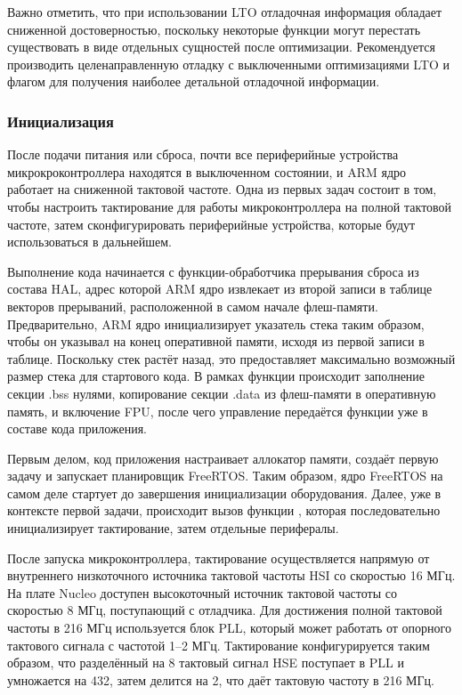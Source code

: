 \documentclass[rusmathsym, eqnumwithinsec, amspack, hyperref]{bomgost}
\begin{document}
Важно отметить, что при использовании LTO отладочная информация обладает сниженной достоверностью, поскольку некоторые функции могут перестать существовать в виде отдельных сущностей после оптимизации. Рекомендуется производить целенаправленную отладку с выключенными оптимизациями LTO и флагом {\footnotesize{}} для получения наиболее детальной отладочной информации.


\subsubsection{Инициализация}

После подачи питания или сброса, почти все периферийные устройства микрокроконтроллера находятся в выключенном состоянии, и ARM ядро работает на сниженной тактовой частоте. Одна из первых задач состоит в том, чтобы настроить тактирование для работы микроконтроллера на полной тактовой частоте, затем сконфигурировать периферийные устройства, которые будут использоваться в дальнейшем.

Выполнение кода начинается с функции-обработчика прерывания сброса из состава HAL, адрес которой ARM ядро извлекает из второй записи в таблице векторов прерываний, расположенной в самом начале флеш-памяти. Предварительно, ARM ядро инициализирует указатель стека таким образом, чтобы он указывал на конец оперативной памяти, исходя из первой записи в таблице. Поскольку стек растёт назад, это предоставляет максимально возможный размер стека для стартового кода. В рамках функции {\footnotesize{}} происходит заполнение секции .bss нулями, копирование секции .data из флеш-памяти в оперативную память, и включение FPU, после чего управление передаётся функции {\footnotesize{}} уже в составе кода приложения.

Первым делом, код приложения настраивает аллокатор памяти, создаёт первую задачу и запускает планировщик FreeRTOS. Таким образом, ядро FreeRTOS на самом деле стартует до завершения инициализации оборудования. Далее, уже в контексте первой задачи, происходит вызов функции {\footnotesize{}}, которая последовательно инициализирует тактирование, затем отдельные перифералы.

После запуска микроконтроллера, тактирование осуществляется напрямую от внутреннего низкоточного источника тактовой частоты HSI со скоростью 16 МГц. На плате Nucleo доступен высокоточный источник тактовой частоты со скоростью 8 МГц, поступающий с отладчика. Для достижения полной тактовой частоты в 216 МГц используется блок PLL, который может работать от опорного тактового сигнала с частотой 1--2 МГц. Тактирование конфигурируется таким образом, что разделённый на 8 тактовый сигнал HSE поступает в PLL и умножается на 432, затем делится на 2, что даёт тактовую частоту в 216 МГц.
\end{document}
